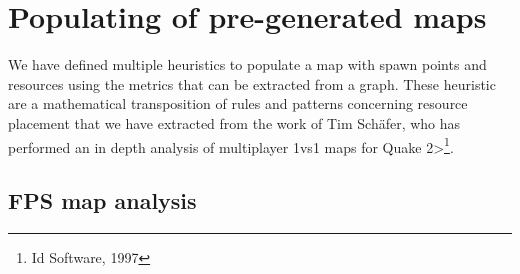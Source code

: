 
\section{Populating of pre-generated maps}

We have defined multiple heuristics to populate a map with spawn points and resources using the metrics that can be extracted from a graph. These heuristic are a mathematical transposition of rules and patterns concerning resource placement that we have extracted from the work of Tim Schäfer\cite{great1vs1}, who has performed an in depth analysis of multiplayer 1vs1 maps for \<Quake 2>\footnote{Id Software, 1997}.


\subsection{FPS map analysis}


